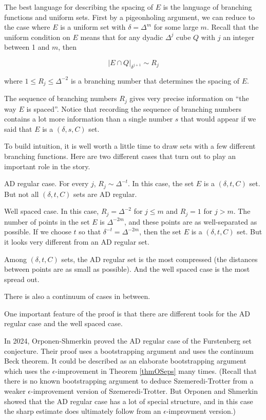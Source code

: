 \documentclass[12pt]{amsart}
\begin{document}
The best language for describing the spacing of $E$ is the language of branching functions and uniform sets.   First by a pigeonholing argument,  we can reduce to the case  where $E$ is a uniform set with $\delta = \Delta^m$ for some large $m$. Recall that the uniform condition on $E$ means that for any dyadic $\Delta^j$ cube $Q$ with $j$ an integer between 1 and $m$, then 

$$ |E\cap Q|_{\delta^{j+1}} \sim R_j$$ 

\noindent where $1\leq R_j \leq \Delta^{-2}$ is a branching number that determines the spacing of $E$. 

The sequence of branching numbers $R_j$ gives very precise information on ``the way $E$ is spaced''.    Notice that recording the sequence of branching numbers contains a lot more information than a single number $s$ that would appear if we said that $E$ is a $(\delta, s, C)$ set.

To build intuition,  it is well worth a little time to draw sets with a few different branching functions.   Here are two different cases that turn out to play an important role in the story.

AD regular case.   For every $j$,  $R_j \sim \Delta^{-t}$.   In this case,  the set $E$ is a $(\delta, t, C)$ set.   But not all $(\delta, t, C)$ sets are AD regular.

Well spaced case.   In this case, $R_j = \Delta^{-2}$ for $j \le m$ and $R_j = 1$ for $j > m$.    The number of points in the set $E$ is $\Delta^{-2m}$, and these points are as well-separated as possible.   If we choose $t$ so that $\delta^{-t} = \Delta^{-2m}$,  then the set $E$ is a $(\delta, t, C)$ set.   But it looks very different from an AD regular set.

Among $(\delta, t, C)$ sets,  the AD regular set is the most compressed (the distances between points are as small as possible).   And the well spaced case is the most spread out.

There is also a continuum of cases in between.

One important feature of the proof is that there are different tools for the AD regular case and the well spaced case.

In 2024,  Orponen-Shmerkin proved the AD regular case of the Furstenberg set conjecture.   Their proof uses a bootstrapping argument and uses the continuum Beck theorem.   It could be described as an elaborate bootstrapping argument which uses the $\epsilon$-improvement in Theorem \ref{thmOSeps} many times.   (Recall that there is no known bootstrapping argument to deduce Szemeredi-Trotter from a weaker $\epsilon$-improvement version of Szemeredi-Trotter.   But Orponen and Shmerkin showed that the AD regular case has a lot of special structure,  and in this case the sharp estimate does ultimately follow from an $\epsilon$-improvment version.)
\end{document}
